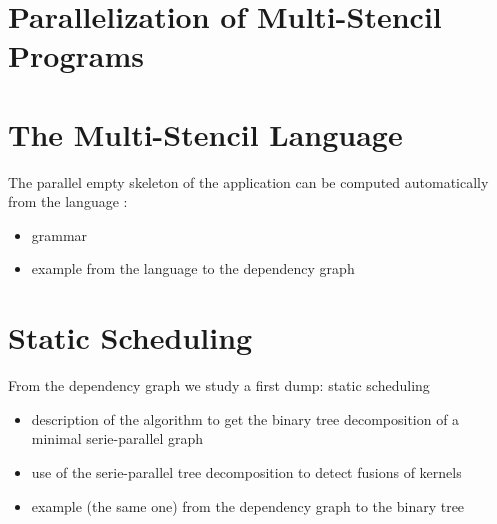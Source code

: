 \documentclass[twocolumn]{svjour3}          %
\begin{document}
\section{Parallelization of Multi-Stencil Programs}
\label{sect:parallelism}

\section{The Multi-Stencil Language}
\label{sect:msl}

The parallel empty skeleton of the application can be computed automatically from the language :
\begin{itemize}
\item grammar
\item example from the language to the dependency graph
\end{itemize}
\section{Static Scheduling}
\label{sect:msp}
%
From the dependency graph we study a first dump: static scheduling
\begin{itemize}
\item description of the algorithm to get the binary tree decomposition of a minimal serie-parallel graph
\item use of the serie-parallel tree decomposition to detect fusions of kernels
\item example (the same one) from the dependency graph to the binary tree
\end{itemize}
\end{document}
